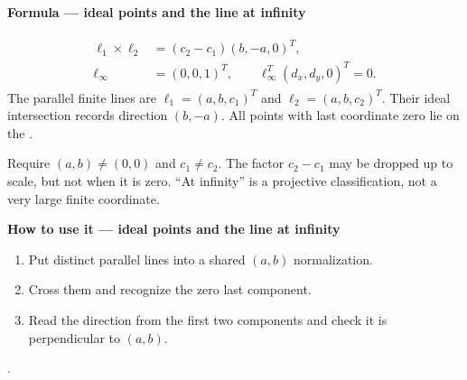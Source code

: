 \documentclass[letterpaper,11pt,english,openany,oneside]{jupyterBook}
\begin{document}
\begin{TextbookBox}
\textbf{Formula — ideal points and the line at infinity}\par\smallskip
\begin{equation}\label{equation:lectures/lecture01/projective:eq-lec01-ideal}
\begin{split}\begin{aligned}
\boldsymbol\ell_1\times\boldsymbol\ell_2
&=(c_2-c_1)(b,-a,0)^T,\\
\boldsymbol\ell_\infty&=(0,0,1)^T,\qquad
\boldsymbol\ell_\infty^T(d_x,d_y,0)^T=0.
\end{aligned}\end{split}
\end{equation}
\sphinxAtStartPar
The parallel finite lines are \(\ell_1=(a,b,c_1)^T\) and \(\ell_2=(a,b,c_2)^T\). Their ideal intersection records direction \((b,-a)\). All points with last coordinate zero lie on the .

\sphinxAtStartPar
{} Require \((a,b)\ne(0,0)\) and \(c_1\ne c_2\). The factor \(c_2-c_1\) may be dropped up to scale, but not when it is zero. “At infinity” is a projective classification, not a very large finite coordinate.

\end{TextbookBox}

\begin{TextbookBox}
\textbf{How to use it — ideal points and the line at infinity}\par\smallskip
\begin{enumerate}
%
\item {}
\sphinxAtStartPar
Put distinct parallel lines into a shared \((a,b)\) normalization.

\item {}
\sphinxAtStartPar
Cross them and recognize the zero last component.

\item {}
\sphinxAtStartPar
Read the direction from the first two components and check it is perpendicular to \((a,b)\).

\end{enumerate}

\sphinxAtStartPar
{} {\hyperref[\detokenize{lectures/lecture01/projective:ex-lec01-intersections}]{}}.

\end{TextbookBox}
\end{document}
